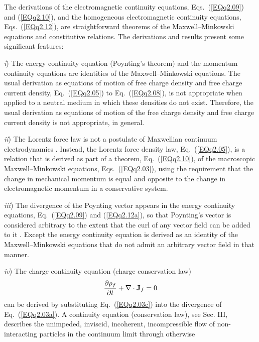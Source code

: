 \documentclass[twocolumn,amssymb,eqsecnum,aps,pra]{revtex4-2}
\begin{document}
\par
The derivations of the electromagnetic continuity equations,
Eqs.~(\ref{EQq2.09}) and (\ref{EQq2.10}), and the homogeneous
electromagnetic continuity equations, Eqs.~(\ref{EQq2.12}),
are straightforward theorems of the Maxwell--Minkowski equations
and constitutive relations.
The derivations and results present some significant features:
\par
\textit {i}) The energy continuity equation (Poynting's theorem) and the
momentum continuity equations are identities of the Maxwell--Minkowski
equations.
The usual derivation \cite{BIBoydMil,BIJackson,BIGriff,BIZangwill}
as equations of motion of free charge density and free charge
current density, Eq.~(\ref{EQq2.05}) to Eq.~(\ref{EQq2.08}),
is not appropriate when applied to a neutral medium in which these
densities do not exist.
Therefore, the usual derivation as equations of motion of the
free charge density and free charge current density is not
appropriate, in general.
\par
\textit {ii}) The Lorentz force law is not a postulate of Maxwellian
continuum electrodynamics \cite{BIManx,BIMansurx}.
Instead, the Lorentz force density law, Eq.~(\ref{EQq2.05}), 
is a relation that is derived
as part of a theorem, Eq.~(\ref{EQq2.10}), of the macroscopic
Maxwell--Minkowski equations, Eqs.~(\ref{EQq2.03}), using the
requirement that the change in mechanical momentum is equal and
opposite to the change in electromagnetic momentum in a conservative
system.
\par
\textit {iii}) The divergence of the Poynting vector appears in the
energy continuity equations, Eq.~(\ref{EQq2.09}) and (\ref{EQq2.12a}),
so that Poynting's vector is considered arbitrary to the
extent that the curl of any vector field can be added to
it \cite{BIJackson,BIZangwill}.
Except the energy continuity equation is derived as an identity of
the Maxwell--Minkowski equations that do not admit an arbitrary
vector field in that manner.
\par
\textit {iv}) The charge continuity equation (charge conservation law)
\begin{equation}
\frac{\partial \rho_f}{\partial t}+\nabla\cdot{\bf J}_f=0
\label{EQq2.13}
\end{equation}
can be derived by substituting Eq.~(\ref{EQq2.03c}) into the
divergence of Eq.~(\ref{EQq2.03a}).
A continuity equation (conservation law), see Sec. III, describes
the unimpeded, inviscid, incoherent, incompressible flow of
non-interacting particles in the continuum limit through otherwise
\end{document}
